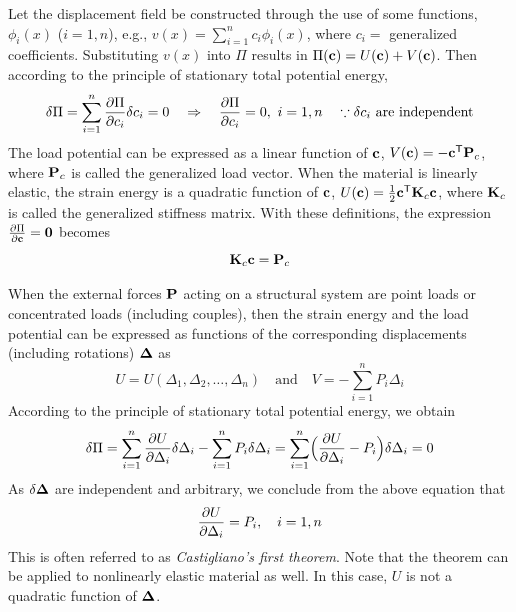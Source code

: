Let the displacement field be constructed through the use of some functions, $\phi_i(x)$ ($i = 1, n$), e.g., $v(x) = \sum_{i=1}^n c_i\phi_i(x)$, where $c_i =$ generalized coefficients. Substituting $v(x)$ into $\Pi$ results in $\Pi(\mathbf{c}) = U(\mathbf{c}) + V(\mathbf{c})$. Then according to the principle of stationary total potential energy,
\begin{equation}
  \delta\Pi = \sum_{i=1}^n\frac{\partial \Pi}{\partial c_i}\delta c_i = 0 \quad\Rightarrow\quad \frac{\partial \Pi}{\partial c_i} = 0,\ i = 1, n \quad\because\delta c_i\text{ are independent}
\end{equation}
The load potential can be expressed as a linear function of $\mathbf{c}$, $V(\mathbf{c}) = -\mathbf{c}^{\mathsf{T}}\mathbf{P}_c$, where $\mathbf{P}_c$ is called the generalized load vector. When the material is linearly elastic, the strain energy is a quadratic function of $\mathbf{c}$, $U(\mathbf{c}) = \frac12\mathbf{c}^{\mathsf{T}}\mathbf{K}_c\mathbf{c}$, where $\mathbf{K}_c$ is called the generalized stiffness matrix. With these definitions, the expression $\frac{\partial \Pi}{\partial \mathbf{c}} = \mathbf{0}$ becomes
\begin{equation}
  \mathbf{K}_c\mathbf{c} = \mathbf{P}_c
\end{equation}

When the external forces $\mathbf{P}$ acting on a structural system are point loads or concentrated loads (including couples), then the strain energy and the load potential can be expressed as functions of the corresponding displacements (including rotations) $\bm{\Delta}$ as
\begin{equation}
  U = U(\Delta_1, \Delta_2, \dots, \Delta_n)\quad\text{and}\quad V = -\sum_{i=1}^n P_i\Delta_i
\end{equation}
According to the principle of stationary total potential energy, we obtain
\begin{equation}
  \delta\Pi = \sum_{i=1}^n\frac{\partial U}{\partial \Delta_i}\delta\Delta_i - \sum_{i=1}^n P_i\delta\Delta_i = \sum_{i=1}^n\Bigl(\frac{\partial U}{\partial \Delta_i} - P_i\Bigr)\delta\Delta_i = 0
\end{equation}
As $\delta\bm{\Delta}$ are independent and arbitrary, we conclude from the above equation that
\begin{equation}
  \frac{\partial U}{\partial \Delta_i} = P_i,\quad i = 1, n
\end{equation}
This is often referred to as \emph{Castigliano's first theorem}. Note that the theorem can be applied to nonlinearly elastic material as well. In this case, $U$ is not a quadratic function of $\bm{\Delta}$.


